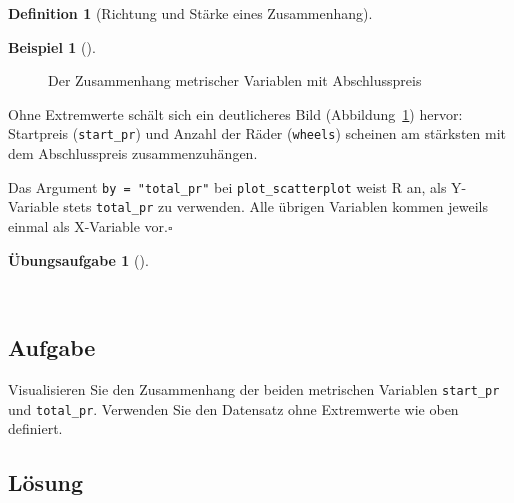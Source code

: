 \documentclass[
  a4paper,
  DIV=11]{scrreprt}
\theoremstyle{definition}
\newtheorem{exercise}{Übungsaufgabe}[chapter]
\theoremstyle{definition}
\newtheorem{example}{Beispiel}[chapter]
\theoremstyle{definition}
\newtheorem{definition}{Definition}[chapter]
\theoremstyle{remark}
\begin{document}
\begin{definition}[Richtung und Stärke eines
Zusammenhang]
\begin{example}[]
\begin{figure}[H]

\caption{\label{fig-mario-scatter2}Der Zusammenhang metrischer Variablen
mit Abschlusspreis}

\end{figure}%

Ohne Extremwerte schält sich ein deutlicheres Bild
(Abbildung~\ref{fig-mario-scatter2}) hervor: Startpreis
(\texttt{start\_pr}) und Anzahl der Räder (\texttt{wheels}) scheinen am
stärksten mit dem Abschlusspreis zusammenzuhängen.

Das Argument \texttt{by\ =\ "total\_pr"} bei \texttt{plot\_scatterplot}
weist R an, als Y-Variable stets \texttt{total\_pr} zu verwenden. Alle
übrigen Variablen kommen jeweils einmal als X-Variable vor.\(\square\)

\end{example}

\begin{exercise}[]\protect\hypertarget{exr-zsmnhang-metrisch}{}\label{exr-zsmnhang-metrisch}

~

\subsection{Aufgabe}

Visualisieren Sie den Zusammenhang der beiden metrischen Variablen
\texttt{start\_pr} und \texttt{total\_pr}. Verwenden Sie den Datensatz
ohne Extremwerte wie oben definiert.

\subsection{Lösung}


\end{exercise}
\end{definition}
\end{document}
